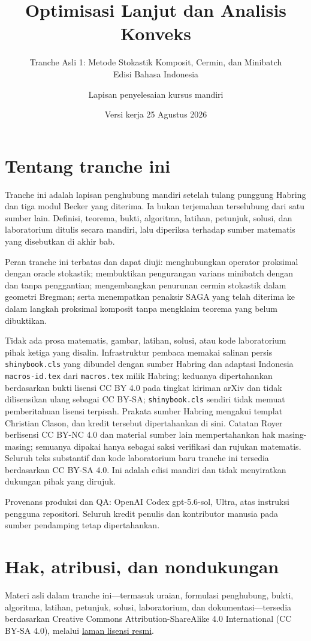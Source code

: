 \documentclass[indonesian]{shinybook}
\title{Optimisasi Lanjut dan Analisis Konveks}
\subtitle{Tranche Asli 1: Metode Stokastik Komposit, Cermin, dan Minibatch\\Edisi Bahasa Indonesia}
\author{Lapisan penyelesaian kursus mandiri}
\date{Versi kerja 25 Agustus 2026}
\begin{document}
\maketitle

\frontmatter
\chapter*{Tentang tranche ini}
Tranche ini adalah lapisan penghubung mandiri setelah tulang punggung Habring
dan tiga modul Becker yang diterima. Ia bukan terjemahan terselubung dari satu
sumber lain. Definisi, teorema, bukti, algoritma, latihan, petunjuk, solusi,
dan laboratorium ditulis secara mandiri, lalu diperiksa terhadap sumber
matematis yang disebutkan di akhir bab.

Peran tranche ini terbatas dan dapat diuji: menghubungkan operator proksimal
dengan oracle stokastik; membuktikan pengurangan varians minibatch dengan dan
tanpa penggantian; mengembangkan penurunan cermin stokastik dalam geometri
Bregman; serta menempatkan penaksir SAGA yang telah diterima ke dalam langkah
proksimal komposit tanpa mengklaim teorema yang belum dibuktikan.

Tidak ada prosa matematis, gambar, latihan, solusi, atau kode laboratorium
pihak ketiga yang disalin. Infrastruktur pembaca memakai salinan persis
\texttt{shinybook.cls} yang dibundel dengan sumber Habring dan adaptasi
Indonesia \texttt{macros-id.tex} dari \texttt{macros.tex} milik Habring;
keduanya dipertahankan berdasarkan bukti lisensi CC BY 4.0 pada tingkat
kiriman arXiv dan tidak dilisensikan ulang sebagai CC BY-SA;
\texttt{shinybook.cls} sendiri tidak memuat pemberitahuan lisensi terpisah.
Prakata sumber Habring mengakui templat Christian Clason, dan kredit tersebut
dipertahankan di sini. Catatan Royer berlisensi
CC BY-NC 4.0 dan material sumber lain mempertahankan hak masing-masing;
semuanya dipakai hanya sebagai saksi verifikasi dan rujukan matematis.
Seluruh teks substantif dan kode laboratorium baru tranche ini tersedia
berdasarkan CC BY-SA 4.0. Ini adalah edisi mandiri dan tidak menyiratkan
dukungan pihak yang dirujuk.

Provenans produksi dan QA: OpenAI Codex gpt-5.6-sol, Ultra, atas instruksi
pengguna repositori. Seluruh kredit penulis dan kontributor manusia pada
sumber pendamping tetap dipertahankan.

\tableofcontents
\mainmatter


\backmatter
\chapter*{Hak, atribusi, dan nondukungan}
Materi asli dalam tranche ini—termasuk uraian, formulasi penghubung, bukti,
algoritma, latihan, petunjuk, solusi, laboratorium, dan dokumentasi—tersedia
berdasarkan Creative Commons Attribution-ShareAlike 4.0 International
(CC BY-SA 4.0), melalui
\href{https://creativecommons.org/licenses/by-sa/4.0/}{laman lisensi resmi}.
\end{document}
